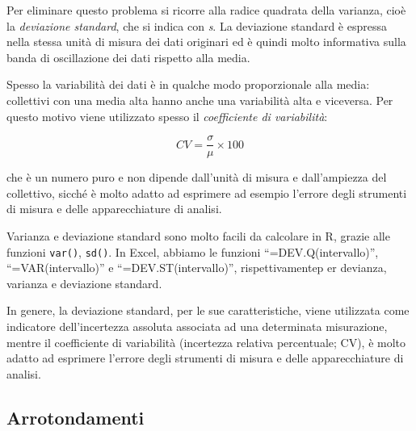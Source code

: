 \documentclass[a4paper,12pt,oneside]{book}
\newenvironment{Shaded}{\begin{snugshade}}{\end{snugshade}}
\newcommand{\KeywordTok}[1]{\textcolor[rgb]{0.13,0.29,0.53}{\textbf{#1}}}
\newcommand{\DecValTok}[1]{\textcolor[rgb]{0.00,0.00,0.81}{#1}}
\newcommand{\StringTok}[1]{\textcolor[rgb]{0.31,0.60,0.02}{#1}}
\newcommand{\OperatorTok}[1]{\textcolor[rgb]{0.81,0.36,0.00}{\textbf{#1}}}
\newcommand{\NormalTok}[1]{#1}
\theoremstyle{definition}
\theoremstyle{definition}
\theoremstyle{definition}
\theoremstyle{remark}
\begin{document}
Per eliminare questo problema si ricorre alla radice quadrata della
varianza, cioè la \emph{deviazione standard}, che si indica con
\emph{s}. La deviazione standard è espressa nella stessa unità di misura
dei dati originari ed è quindi molto informativa sulla banda di
oscillazione dei dati rispetto alla media.

Spesso la variabilità dei dati è in qualche modo proporzionale alla
media: collettivi con una media alta hanno anche una variabilità alta e
viceversa. Per questo motivo viene utilizzato spesso il
\emph{coefficiente di variabilità}:

\[CV = \frac{\sigma }{\mu } \times 100\]

che è un numero puro e non dipende dall'unità di misura e dall'ampiezza
del collettivo, sicché è molto adatto ad esprimere ad esempio l'errore
degli strumenti di misura e delle apparecchiature di analisi.

Varianza e deviazione standard sono molto facili da calcolare in R,
grazie alle funzioni \texttt{var()}, \texttt{sd()}. In Excel, abbiamo le
funzioni ``=DEV.Q(intervallo)'', ``=VAR(intervallo)'' e
``=DEV.ST(intervallo)'', rispettivamentep er devianza, varianza e
deviazione standard.

In genere, la deviazione standard, per le sue caratteristiche, viene
utilizzata come indicatore dell'incertezza assoluta associata ad una
determinata misurazione, mentre il coefficiente di variabilità
(incertezza relativa percentuale; CV), è molto adatto ad esprimere
l'errore degli strumenti di misura e delle apparecchiature di analisi.

\begin{Shaded}
\end{Shaded}

\subsection*{Arrotondamenti}\label{arrotondamenti}
\end{document}
